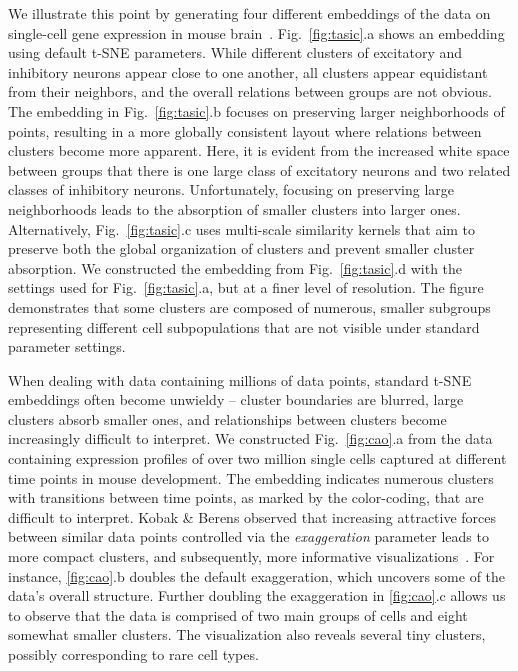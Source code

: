 \documentclass[article]{jss}
\begin{document}
We illustrate this point by generating four different embeddings of the data on single-cell gene expression in mouse brain~\citep{tasic2018shared}. Fig.~\ref{fig:tasic}.a shows an embedding using default t-SNE parameters. While different clusters of excitatory and inhibitory neurons appear close to one another, all clusters appear equidistant from their neighbors, and the overall relations between groups are not obvious. The embedding in Fig.~\ref{fig:tasic}.b focuses on preserving larger neighborhoods of points, resulting in a more globally consistent layout where relations between clusters become more apparent. Here, it is evident from the increased white space between groups that there is one large class of excitatory neurons and two related classes of inhibitory neurons. Unfortunately, focusing on preserving large neighborhoods leads to the absorption of smaller clusters into larger ones. Alternatively, Fig.~\ref{fig:tasic}.c uses multi-scale similarity kernels that aim to preserve both the global organization of clusters and prevent smaller cluster absorption. We constructed the embedding from Fig.~\ref{fig:tasic}.d with the settings used for Fig.~\ref{fig:tasic}.a, but at a finer level of resolution. The figure demonstrates that some clusters are composed of numerous, smaller subgroups representing different cell subpopulations that are not visible under standard parameter settings.

When dealing with data containing millions of data points, standard t-SNE embeddings often become unwieldy -- cluster boundaries are blurred, large clusters absorb smaller ones, and relationships between clusters become increasingly difficult to interpret. We constructed Fig.~\ref{fig:cao}.a from the data containing expression profiles of over two million single cells captured at different time points in mouse development. The embedding indicates numerous clusters with transitions between time points, as marked by the color-coding, that are difficult to interpret. Kobak \& Berens observed that increasing attractive forces between similar data points controlled via the \textit{exaggeration} parameter leads to more compact clusters, and subsequently, more informative visualizations~\citep{kobak2019art}. For instance, \ref{fig:cao}.b doubles the default exaggeration, which uncovers some of the data's overall structure. Further doubling the exaggeration in \ref{fig:cao}.c allows us to observe that the data is comprised of two main groups of cells and eight somewhat smaller clusters. The visualization also reveals several tiny clusters, possibly corresponding to rare cell types.
\end{document}
